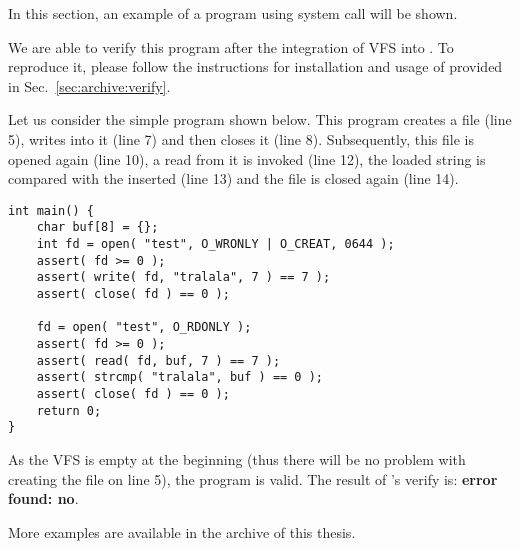 In this section, an example of a program using system call will be shown.

 We are able to verify this program after the integration of VFS into \divine. To reproduce it, please follow the instructions for installation and usage of \divine provided in Sec.~\ref{sec:archive:verify}.

Let us consider the simple program shown below. This program creates a file (line 5),  writes into it (line 7) and then closes it (line 8). Subsequently, this file is opened again (line 10), a read from it is invoked (line 12), the loaded string is compared with the inserted (line 13) and the file is closed again (line 14).

\begin{lstlisting}[style=Cpp]
int main() {
    char buf[8] = {};
    int fd = open( "test", O_WRONLY | O_CREAT, 0644 );
    assert( fd >= 0 );
    assert( write( fd, "tralala", 7 ) == 7 );
    assert( close( fd ) == 0 );
    
    fd = open( "test", O_RDONLY );
    assert( fd >= 0 );
    assert( read( fd, buf, 7 ) == 7 );
    assert( strcmp( "tralala", buf ) == 0 );
    assert( close( fd ) == 0 );
    return 0;
}
\end{lstlisting}

As the VFS is empty at the beginning (thus there will be no problem with creating the file on line 5), the program is valid. The result of \divine's verify is: \textbf{error found: no}.

More examples are available in the archive of this thesis. 